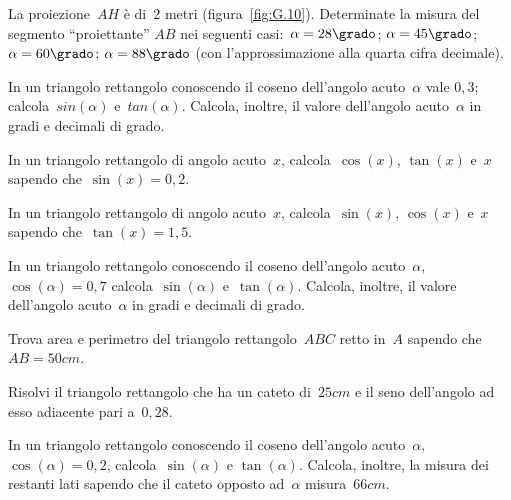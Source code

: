 \begin{multicols}{2}
\begin{esercizio}
\label{ese:G.14}
La proiezione~$AH$ è di~$2$ metri (figura~\ref{fig:G.10}). Determinate la misura del segmento ``proiettante'' $AB$ nei seguenti casi:~$\alpha=28\grado$;
$\alpha=45\grado$; $\alpha=60\grado$; $\alpha=88\grado$ (con l'approssimazione alla quarta cifra decimale).
\end{esercizio}

\begin{esercizio}
\label{ese:G.15}
In un triangolo rettangolo conoscendo il coseno dell'angolo acuto~$\alpha$ vale $0,3$; calcola~$sin(\alpha)$ e~$tan(\alpha)$.
Calcola, inoltre, il valore dell'angolo acuto~$\alpha$ in gradi e decimali di grado.
\end{esercizio}

\begin{esercizio}
\label{ese:G.16}
In un triangolo rettangolo di angolo acuto~$x$, calcola~$\cos(x)$, $\tan(x)$ e~$x$ sapendo che~$\sin(x)=0,2$.
\end{esercizio}

\begin{esercizio}
\label{ese:G.17}
In un triangolo rettangolo di angolo acuto~$x$, calcola~$\sin(x)$, $\cos(x)$ e~$x$ sapendo che~$\tan(x)=1,5$.
\end{esercizio}

\begin{esercizio}
\label{ese:G.18}
In un triangolo rettangolo conoscendo il coseno dell'angolo acuto~$\alpha$, $\cos(\alpha)=0,7$ calcola~$\sin(\alpha)$ e~$\tan(\alpha)$.
Calcola, inoltre, il valore dell'angolo acuto~$\alpha$ in gradi e decimali di grado.
\end{esercizio}

\begin{esercizio}
\label{ese:G.19}
Trova area e perimetro del triangolo rettangolo~$ABC$ retto in~$A$ sapendo che~$AB=50\unit{cm}$.
\end{esercizio}

\begin{esercizio}
\label{ese:G.20}
Risolvi il triangolo rettangolo che ha un cateto di~$25\unit{cm}$ e il seno dell'angolo ad esso adiacente pari a~$0,28$.
\end{esercizio}

\begin{esercizio}
\label{ese:G.21}
In un triangolo rettangolo conoscendo il coseno dell'angolo acuto~$\alpha$, $\cos(\alpha)= 0,2$, calcola~$\sin(\alpha)$ e
$\tan(\alpha)$. Calcola, inoltre, la misura dei restanti lati sapendo che il cateto opposto ad~$\alpha$ misura~$66\unit{cm}$.
\end{esercizio}
\end{multicols}

